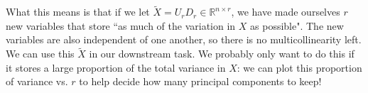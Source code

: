 What this means is that if we let $\tilde{X} = U_r D_r \in \mathbb{R}^{n \times r}$, we have made ourselves $r$ new variables that store ``as much of the variation in $X$ as possible". The new variables are also independent of one another, so there is no multicollinearity left. We can use this $\tilde{X}$ in our downstream task. We probably only want to do this if it stores a large proportion of the total variance in $X$: we can plot this proportion of variance vs. $r$ to help decide how many principal components to keep! 
















